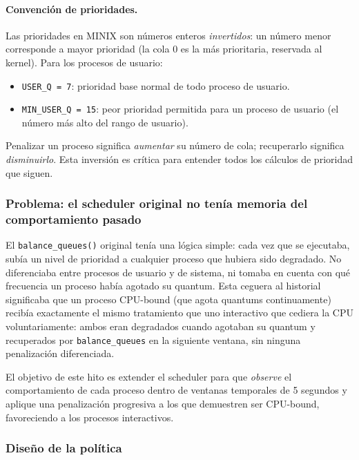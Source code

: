\documentclass[11pt,a4paper]{article}
\begin{document}
\paragraph{Convenci\'on de prioridades.}
Las prioridades en MINIX son n\'umeros enteros \emph{invertidos}: un n\'umero menor corresponde a mayor prioridad (la cola 0 es la m\'as prioritaria, reservada al kernel). Para los procesos de usuario:

\begin{itemize}[leftmargin=*]
  \item \texttt{USER\_Q = 7}: prioridad base normal de todo proceso de usuario.
  \item \texttt{MIN\_USER\_Q = 15}: peor prioridad permitida para un proceso de usuario (el n\'umero m\'as alto del rango de usuario).
\end{itemize}

Penalizar un proceso significa \emph{aumentar} su n\'umero de cola; recuperarlo significa \emph{disminuirlo}. Esta inversi\'on es cr\'itica para entender todos los c\'alculos de prioridad que siguen.

\subsubsection*{Problema: el scheduler original no ten\'ia memoria del comportamiento pasado}

El \texttt{balance\_queues()} original ten\'ia una l\'ogica simple: cada vez que se ejecutaba, sub\'ia un nivel de prioridad a cualquier proceso que hubiera sido degradado. No diferenciaba entre procesos de usuario y de sistema, ni tomaba en cuenta con qu\'e frecuencia un proceso hab\'ia agotado su quantum. Esta ceguera al historial significaba que un proceso CPU-bound (que agota quantums continuamente) recib\'ia exactamente el mismo tratamiento que uno interactivo que cediera la CPU voluntariamente: ambos eran degradados cuando agotaban su quantum y recuperados por \texttt{balance\_queues} en la siguiente ventana, sin ninguna penalizaci\'on diferenciada.

El objetivo de este hito es extender el scheduler para que \emph{observe} el comportamiento de cada proceso dentro de ventanas temporales de 5 segundos y aplique una penalizaci\'on progresiva a los que demuestren ser CPU-bound, favoreciendo a los procesos interactivos.

\subsubsection*{Dise\~no de la pol\'itica}
\end{document}

